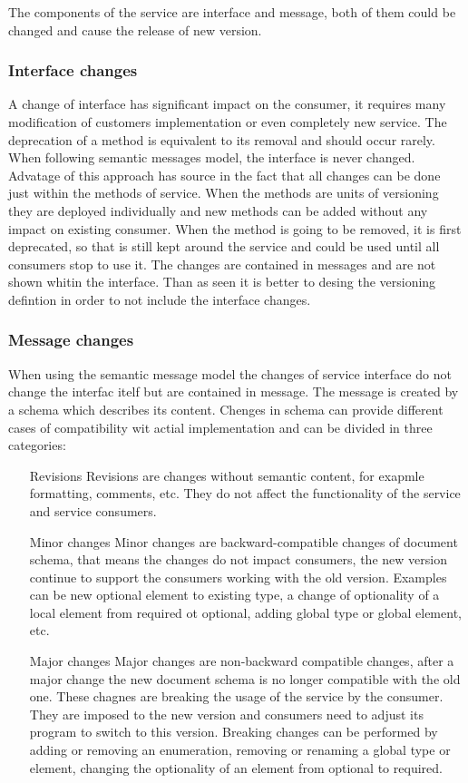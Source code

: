 The components of the service are interface and message, both of them could be changed and cause the release of new version.

\subsubsection{Interface changes}
A change of interface has significant impact on the consumer, it requires many modification of customers implementation or even completely new service. The deprecation of a method is equivalent to its removal and should occur rarely.
When following semantic messages model, the interface is never changed. Advatage of this approach has source in the fact that all changes can be done just within the methods of service. When the methods are units of versioning they are deployed individually and new methods can be added without any impact on existing consumer. When the method is going to be removed, it is first deprecated, so that is still kept around the service and could be used until all consumers stop to use it. The changes are contained in messages and are not shown whitin the interface.
Than as seen it is better to desing the versioning defintion in order to not include the interface changes.

\subsubsection{Message changes}
When using the semantic message model the changes of service interface do not change the interfac itelf but are contained in message. The message is created by a schema which describes its content. Chenges in schema can provide different cases of compatibility wit actial implementation and can be divided in three categories:

\begin{enumerate}
  \item[Revisions]
  Revisions are changes without semantic content, for exapmle formatting, comments, etc. They do not affect the functionality of the service and service consumers.
  
  \item[Minor changes]
  Minor changes are backward-compatible changes of document schema, that means the changes do not impact consumers, the new version continue to support the consumers working with the old version. Examples can be new optional element to existing type, a change of optionality of a local element from required ot optional, adding global type or global element, etc.
  
  \item[Major changes]
  Major changes are non-backward compatible changes, after a major change the new document schema is no longer compatible with the old one. These chagnes are breaking the usage of the service by the consumer. They are imposed to the new version and consumers need to adjust its program to switch to this version. Breaking changes can be performed by adding or removing an enumeration, removing or renaming a global type or element, changing the optionality of an element from optional to required.
\end{enumerate} 

